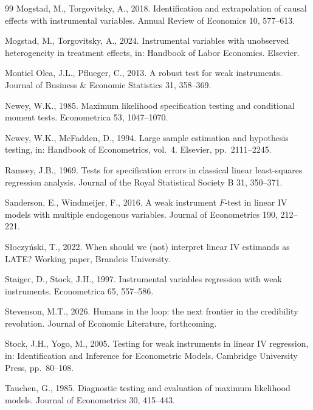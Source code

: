 \documentclass[preprint,11pt,authoryear]{elsarticle}
\theoremstyle{definition}
\begin{document}
\begin{thebibliography}{99}
Mogstad, M., Torgovitsky, A., 2018. Identification and extrapolation of causal
effects with instrumental variables. Annual Review of Economics 10, 577--613.

Mogstad, M., Torgovitsky, A., 2024. Instrumental variables with unobserved
heterogeneity in treatment effects, in: Handbook of Labor Economics. Elsevier.

Montiel Olea, J.L., Pflueger, C., 2013. A robust test for weak instruments.
Journal of Business \& Economic Statistics 31, 358--369.

Newey, W.K., 1985. Maximum likelihood specification testing and conditional
moment tests. Econometrica 53, 1047--1070.

Newey, W.K., McFadden, D., 1994. Large sample estimation and hypothesis testing,
in: Handbook of Econometrics, vol.~4. Elsevier, pp.~2111--2245.

Ramsey, J.B., 1969. Tests for specification errors in classical linear
least-squares regression analysis. Journal of the Royal Statistical Society B 31,
350--371.

Sanderson, E., Windmeijer, F., 2016. A weak instrument $F$-test in linear IV
models with multiple endogenous variables. Journal of Econometrics 190, 212--221.

S{\l}oczy{\'n}ski, T., 2022. When should we (not) interpret linear IV estimands
as LATE? Working paper, Brandeis University.

Staiger, D., Stock, J.H., 1997. Instrumental variables regression with weak
instruments. Econometrica 65, 557--586.

Stevenson, M.T., 2026. Humans in the loop: the next frontier in the credibility revolution. Journal of Economic Literature, forthcoming.

Stock, J.H., Yogo, M., 2005. Testing for weak instruments in linear IV
regression, in: Identification and Inference for Econometric Models. Cambridge
University Press, pp.~80--108.

Tauchen, G., 1985. Diagnostic testing and evaluation of maximum likelihood
models. Journal of Econometrics 30, 415--443.

\end{thebibliography}
\end{document}
